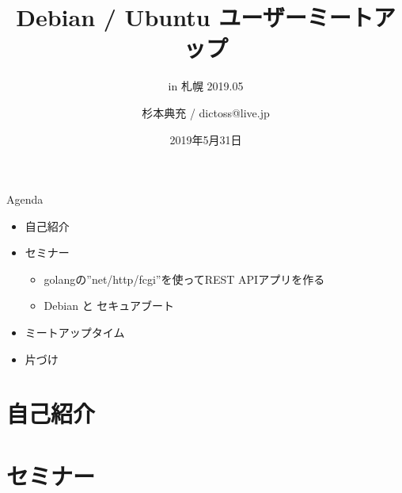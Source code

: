 \title{Debian / Ubuntu ユーザーミートアップ}
\subtitle{in 札幌 2019.05}
\author{杉本典充 / dictoss@live.jp}
\date{2019年5月31日}



\begin{frame}
\titlepage{}
\end{frame}

\begin{frame}{Agenda}
  \begin{itemize}
  \item 自己紹介
  \item セミナー
    \begin{itemize}
    \item golangの''net/http/fcgi''を使ってREST APIアプリを作る
    \item Debian と セキュアブート
    \end{itemize}
  \item ミートアップタイム
  \item 片づけ
  \end{itemize}
\end{frame}


\section{自己紹介}

{\footnotesize
  
}

\section{セミナー}

